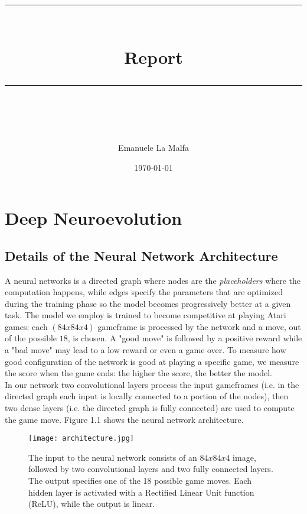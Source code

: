 \documentclass[11pt]{scrartcl} %
\title{	
	\normalfont\normalsize
	\textsc{}\\ %
	\vspace{25pt} %
	\rule{\linewidth}{0.5pt}\\ %
	\vspace{20pt} %
	{\huge Report}\\ %
	\vspace{12pt} %
	\rule{\linewidth}{2pt}\\ %
	\vspace{12pt} %
}
\author{\LARGE Emanuele La Malfa} %
\date{\normalsize\today} %
\begin{document}
\maketitle %

\section{Deep Neuroevolution}

\subsection{Details of the Neural Network Architecture}

A neural networks is a directed graph where nodes are the \textit{placeholders} where the computation happens, while edges specify the parameters that are optimized during the training phase so the model becomes progressively better at a given task. The model we employ is trained to become competitive at playing Atari games: each $(84x84x4)$ gameframe is processed by the network and a move, out of the possible $18$, is chosen. A "good move" is followed by a positive reward while a "bad move" may lead to a low reward or even a game over. To measure how good configuration of the network is good at playing a specific game, we measure the score when the game ends: the higher the score, the better the model. \\
In our network two convolutional layers process the input gameframes (i.e. in the directed graph each input is locally connected to a portion of the nodes), then two dense layers (i.e. the directed graph is fully connected) are used to compute the game move. Figure 1.1 shows the neural network architecture. \\

\begin{figure}[h] %
	\centering
	\texttt{[image: architecture.jpg]} %
	\caption{The input to the neural network consists of an $84x84x4$ image, followed by two convolutional layers and two fully connected layers. The output specifies one of the 18 possible game moves. Each hidden layer is activated with a Rectified Linear Unit function (ReLU), while the output is linear.}
\end{figure}
\end{document}

